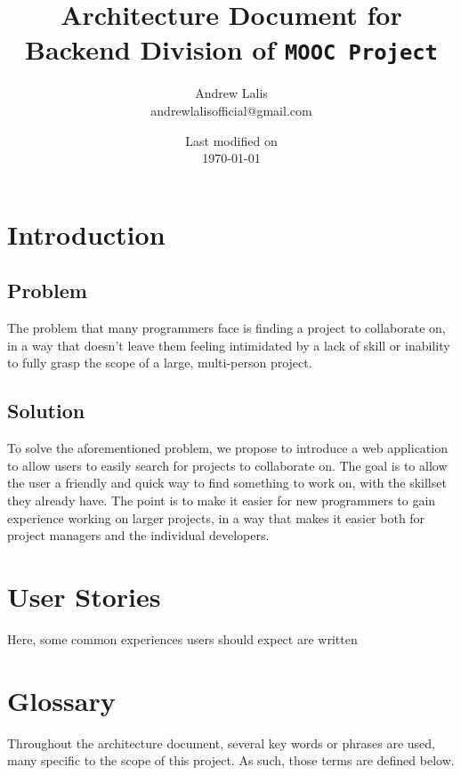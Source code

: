 \documentclass[a4paper, 12pt]{article}
\newcommand{\projectTitle}{\texttt{MOOC Project} }
\begin{document}
\title{Architecture Document for Backend Division of \projectTitle}
\author{Andrew Lalis\\ andrewlalisofficial@gmail.com}
\date{Last modified on\\ \today}
\maketitle

\setcounter{tocdepth}{3}
\tableofcontents

\section{Introduction}
	\subsection{Problem}
		The problem that many programmers face is finding a project to collaborate on, in a way that doesn't leave them feeling intimidated by a lack of skill or inability to fully grasp the scope of a large, multi-person project.
	\subsection{Solution}
		To solve the aforementioned problem, we propose to introduce a web application to allow users to easily search for projects to collaborate on. The goal is to allow the user a friendly and quick way to find something to work on, with the skillset they already have. The point is to make it easier for new programmers to gain experience working on larger projects, in a way that makes it easier both for project managers and the individual developers.

\section{User Stories}
	Here, some common experiences users should expect are written 

\section{Glossary}
	Throughout the architecture document, several key words or phrases are used, many specific to the scope of this project. As such, those terms are defined below.
\end{document}
